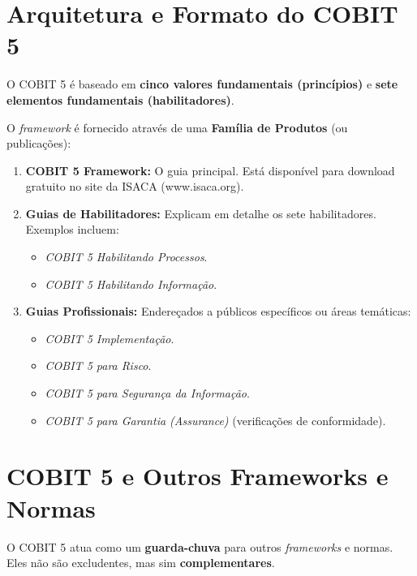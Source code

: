 \documentclass[
]{book}
\providecommand{\tightlist}{%
  \setlength{\itemsep}{0pt}\setlength{\parskip}{0pt}}
\begin{document}
\section{Arquitetura e Formato do COBIT 5}\label{arquitetura-e-formato-do-cobit-5}

O COBIT 5 é baseado em \textbf{cinco valores fundamentais (princípios)} e \textbf{sete elementos fundamentais (habilitadores)}.

O \emph{framework} é fornecido através de uma \textbf{Família de Produtos} (ou publicações):

\begin{enumerate}
\def\labelenumi{\arabic{enumi}.}
\tightlist
\item
  \textbf{COBIT 5 Framework:} O guia principal. Está disponível para download gratuito no site da ISACA (www.isaca.org).
\item
  \textbf{Guias de Habilitadores:} Explicam em detalhe os sete habilitadores. Exemplos incluem:

  \begin{itemize}
  \tightlist
  \item
    \emph{COBIT 5 Habilitando Processos}.
  \item
    \emph{COBIT 5 Habilitando Informação}.
  \end{itemize}
\item
  \textbf{Guias Profissionais:} Endereçados a públicos específicos ou áreas temáticas:

  \begin{itemize}
  \tightlist
  \item
    \emph{COBIT 5 Implementação}.
  \item
    \emph{COBIT 5 para Risco}.
  \item
    \emph{COBIT 5 para Segurança da Informação}.
  \item
    \emph{COBIT 5 para Garantia (Assurance)} (verificações de conformidade).
  \end{itemize}
\end{enumerate}

\section{COBIT 5 e Outros Frameworks e Normas}\label{cobit-5-e-outros-frameworks-e-normas}

O COBIT 5 atua como um \textbf{guarda-chuva} para outros \emph{frameworks} e normas. Eles não são excludentes, mas sim \textbf{complementares}.
\end{document}
